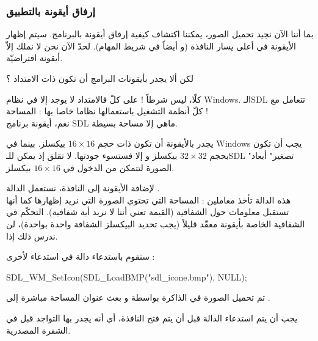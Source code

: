 \subsubsection{إرفاق أيقونة بالتطبيق}

بما أننا الآن نجيد تحميل الصور، يمكننا اكتشاف كيفية إرفاق أيقونة بالبرنامج. سيتم إظهار الأيقونة في أعلى يسار النافذة (و أيضاً في شريط المهام). لحدّ الآن نحن لا نملك إلاّ أيقونة افتراضيّة.

\begin{question}
لكن ألا يجدر بأيقونات البرامج أن تكون ذات الامتداد
 ؟
\end{question}

كلّا، ليس شرطاً ! على كلّ فالامتداد
لا يوجد إلا في نظام
\textenglish{Windows}.
 الـ\textenglish{SDL}
تتعامل مع كلّ أنظمة التشغيل باستعمالها نظاما خاصا بها : المساحة !\\
نعم، أيقونة برنامج 
\textenglish{SDL}
ماهي إلا مساحة بسيطة.

\begin{warning}
يجدر بالأيقونة أن تكون ذات حجم 
$16 \times 16$
بيكسلز. بينما في 
\textenglish{Windows}
يجب أن تكون بحجم
$32 \times 32$
بيكسلز و إلا فستسوء جودتها. لا تقلق إذ يمكن للـ\textenglish{SDL}
"تصغير" أبعاد الصورة لتتمكن من الدخول في 
$16 \times 16$
بيكسلز.
\end{warning}

لإضافة الأيقونة إلى النافذة، نستعمل الدالة 
.\\
هذه الدالة تأخذ معاملين : المساحة التي تحتوي الصورة التي نريد إظهارها كما أنها تستقبل معلومات حول الشفافية (القيمة 
تعني أننا لا نريد أية شفافية). التحكّم في الشفافية الخاصة بأيقونة معقّد قليلاً (يجب تحديد البيكسلز الشفافة واحدة بواحدة)، لن ندرس ذلك إذا.

سنقوم باستدعاء دالة في استدعاء لأخرى :

\begin{Csource}
SDL_WM_SetIcon(SDL_LoadBMP("sdl_icone.bmp"), NULL);
\end{Csource}
 
تم تحميل الصورة في الذاكرة بواسطة
و بعث عنوان المساحة مباشرة إلى
.

\begin{critical}
يجب أن يتم استدعاء الدالة
قبل أن يتم فتح النافذة، أي أنه يجدر بها التواجد قبل
في الشفرة المصدرية.
\end{critical}

